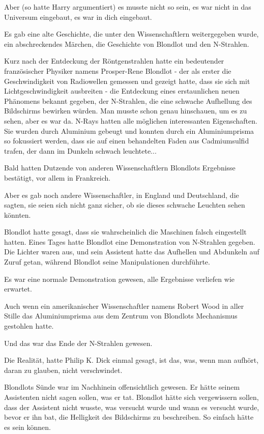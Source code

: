 Aber (so hatte Harry argumentiert) es musste nicht so sein, es war nicht in das
Universum eingebaut, es war in dich eingebaut.

Es gab eine alte Geschichte, die unter den Wissenschaftlern weitergegeben wurde,
ein abschreckendes Märchen, die Geschichte von Blondlot und den N-Strahlen.

Kurz nach der Entdeckung der Röntgenstrahlen hatte ein bedeutender französischer
Physiker namens Prosper-Rene Blondlot - der als erster die Geschwindigkeit von
Radiowellen gemessen und gezeigt hatte, dass sie sich mit Lichtgeschwindigkeit
ausbreiten - die Entdeckung eines erstaunlichen neuen Phänomens bekannt gegeben,
der N-Strahlen, die eine schwache Aufhellung des Bildschirms bewirken würden.
Man musste schon genau hinschauen, um es zu sehen, aber es war da. N-Rays hatten
alle möglichen interessanten Eigenschaften. Sie wurden durch Aluminium gebeugt
und konnten durch ein Aluminiumprisma so fokussiert werden, dass sie auf einen
behandelten Faden aus Cadmiumsulfid trafen, der dann im Dunkeln schwach
leuchtete...

Bald hatten Dutzende von anderen Wissenschaftlern Blondlots Ergebnisse
bestätigt, vor allem in Frankreich.

Aber es gab noch andere Wissenschaftler, in England und Deutschland, die sagten,
sie seien sich nicht ganz sicher, ob sie dieses schwache Leuchten sehen könnten.


Blondlot hatte gesagt, dass sie wahrscheinlich die Maschinen falsch eingestellt
hatten. Eines Tages hatte Blondlot eine Demonstration von N-Strahlen gegeben.
Die Lichter waren aus, und sein Assistent hatte das Aufhellen und Abdunkeln auf
Zuruf getan, während Blondlot seine Manipulationen durchführte.

Es war eine normale Demonstration gewesen, alle Ergebnisse verliefen wie
erwartet.

Auch wenn ein amerikanischer Wissenschaftler namens Robert Wood in aller Stille
das Aluminiumprisma aus dem Zentrum von Blondlots Mechanismus gestohlen hatte.

Und das war das Ende der N-Strahlen gewesen.

Die Realität, hatte Philip K. Dick einmal gesagt, ist das, was, wenn man
aufhört, daran zu glauben, nicht verschwindet.

Blondlots Sünde war im Nachhinein offensichtlich gewesen. Er hätte seinem
Assistenten nicht sagen sollen, was er tat. Blondlot hätte sich vergewissern
sollen, dass der Assistent nicht wusste, was versucht wurde und wann es versucht
wurde, bevor er ihn bat, die Helligkeit des Bildschirms zu beschreiben. So
einfach hätte es sein können.

